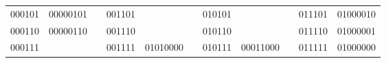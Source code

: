 \documentclass[11pt,spanish]{book}
\begin{document}
\begin{table}[H]
\begin{tabular}{lllllllllll}
\multicolumn{1}{|l|}{000101} & \multicolumn{1}{l|}{00000101} & \multicolumn{1}{l|}{} & \multicolumn{1}{l|}{001101} & \multicolumn{1}{l|}{} & \multicolumn{1}{l|}{} & \multicolumn{1}{l|}{010101} & \multicolumn{1}{l|}{} & \multicolumn{1}{l|}{} & \multicolumn{1}{l|}{011101} & \multicolumn{1}{l|}{01000010} \\ \cline{1-2} \cline{4-5} \cline{7-8} \cline{10-11} 
\multicolumn{1}{|l|}{000110} & \multicolumn{1}{l|}{00000110} & \multicolumn{1}{l|}{} & \multicolumn{1}{l|}{001110} & \multicolumn{1}{l|}{} & \multicolumn{1}{l|}{} & \multicolumn{1}{l|}{010110} & \multicolumn{1}{l|}{} & \multicolumn{1}{l|}{} & \multicolumn{1}{l|}{011110} & \multicolumn{1}{l|}{01000001} \\ \cline{1-2} \cline{4-5} \cline{7-8} \cline{10-11} 
\multicolumn{1}{|l|}{000111} & \multicolumn{1}{l|}{} & \multicolumn{1}{l|}{} & \multicolumn{1}{l|}{001111} & \multicolumn{1}{l|}{01010000} & \multicolumn{1}{l|}{} & \multicolumn{1}{l|}{010111} & \multicolumn{1}{l|}{00011000} & \multicolumn{1}{l|}{} & \multicolumn{1}{l|}{011111} & \multicolumn{1}{l|}{01000000} \\ \cline{1-2} \cline{4-5} \cline{7-8} \cline{10-11} 
\end{tabular}
\end{table}
\end{document}
